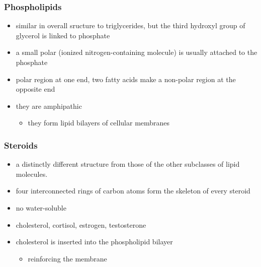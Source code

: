 \documentclass[11pt]{article}
\begin{document}
\subsubsection{Phospholipids}
\label{sec:orgbac7e5a}
\begin{itemize}
\item similar in overall sructure to triglycerides, but the third hydroxyl group of glycerol is linked to phosphate
\item a small polar (ionized nitrogen-containing molecule) is usually attached to the phosphate
\item polar region at one end, two fatty acids make a non-polar region at the opposite end
\item they are amphipathic
\begin{itemize}
\item they form lipid bilayers of cellular membranes
\end{itemize}
\end{itemize}
\subsubsection{Steroids}
\label{sec:org96fda32}
\begin{itemize}
\item a distinctly different structure from those of the other subclasses of lipid molecules.
\item four interconnected rings of carbon atoms form the skeleton of every steroid
\item no water-soluble
\item cholesterol, cortisol, estrogen, testosterone
\item cholesterol is inserted into the phospholipid bilayer
\begin{itemize}
\item reinforcing the membrane
\end{itemize}
\end{itemize}
\end{document}

